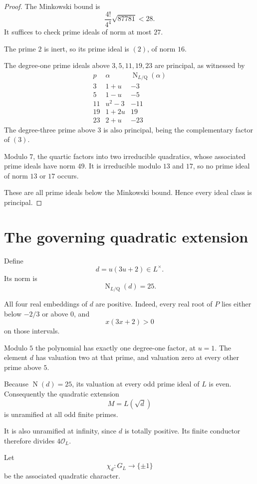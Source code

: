 \documentclass[11pt]{article}
\newcommand{\Q}{\mathrm Q}
\newcommand{\Ocal}{\mathcal O}
\newcommand{\Nm}{\operatorname{N}}
\begin{document}
\begin{proof}
The Minkowski bound is
\[
\frac{4!}{4^4}\sqrt{87781}<28.
\]
It suffices to check prime ideals of norm
at most $27$.

The prime $2$ is inert, so its prime ideal
is $(2)$, of norm $16$.

The degree-one prime ideals above
$3,5,11,19,23$ are principal, as witnessed
by
\[
\begin{array}{c|c|r}
p&\alpha&\Nm_{L/\Q}(\alpha)\\ \hline
3&1+u&-3\\
5&1-u&-5\\
11&u^2-3&-11\\
19&1+2u&19\\
23&2+u&-23
\end{array}
\]
The degree-three prime above $3$ is also
principal, being the complementary factor
of $(3)$.

Modulo $7$, the quartic factors into two
irreducible quadratics, whose associated
prime ideals have norm $49$.
It is irreducible modulo $13$ and $17$,
so no prime ideal of norm $13$ or $17$
occurs.

These are all prime ideals below the
Minkowski bound. Hence every ideal class
is principal.
\end{proof}

\section{The governing quadratic extension}

Define
\[
d=u(3u+2)\in L^\times.
\]
Its norm is
\[
\Nm_{L/\Q}(d)=25.
\]

All four real embeddings of $d$ are positive.
Indeed, every real root of $P$ lies either
below $-2/3$ or above $0$, and
\[
x(3x+2)>0
\]
on those intervals.

Modulo $5$ the polynomial has exactly
one degree-one factor, at $u=1$.
The element $d$ has valuation two at
that prime, and valuation zero at every
other prime above $5$.

Because $\Nm(d)=25$, its valuation
at every odd prime ideal of $L$ is even.
Consequently the quadratic extension
\[
M=L(\sqrt d)
\]
is unramified at all odd finite primes.

It is also unramified at infinity,
since $d$ is totally positive.
Its finite conductor therefore divides
$4\Ocal_L$.

Let
\[
\chi_d:G_L\longrightarrow\{\pm1\}
\]
be the associated quadratic character.
\end{document}
